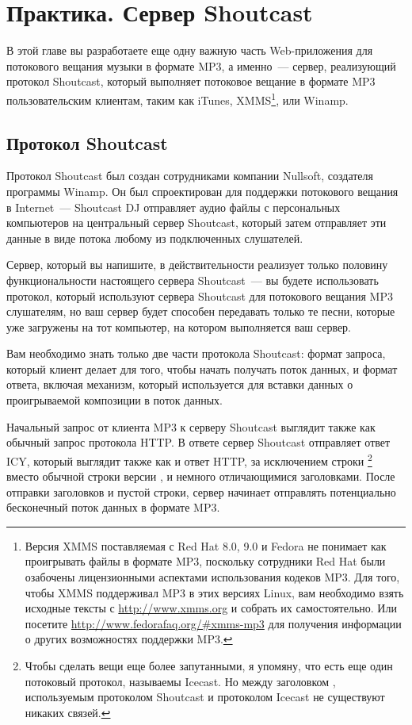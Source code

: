 \chapter{Практика. Сервер Shoutcast}
\label{ch:28}

В этой главе вы разработаете еще одну важную часть Web-приложения для потокового вещания
музыки в формате MP3, а именно~--- сервер, реализующий протокол Shoutcast, который
выполняет потоковое вещание в формате MP3 пользовательским клиентам, таким как iTunes,
XMMS\footnote{Версия XMMS поставляемая с Red Hat 8.0, 9.0 и Fedora не понимает как
  проигрывать файлы в формате MP3, поскольку сотрудники Red Hat были озабочены
  лицензионными аспектами использования кодеков MP3.  Для того, чтобы XMMS поддерживал MP3
  в этих версиях Linux, вам необходимо взять исходные тексты с \url{http://www.xmms.org} и
  собрать их самостоятельно.  Или посетите \url{http://www.fedorafaq.org/#xmms-mp3} для
  получения информации о других возможностях поддержки MP3.}, или Winamp.

\section{Протокол Shoutcast}

Протокол Shoutcast был создан сотрудниками компании Nullsoft, создателя программы
Winamp. Он был спроектирован для поддержки потокового вещания в Internet~--- Shoutcast DJ
отправляет аудио файлы с персональных компьютеров на центральный сервер Shoutcast, который
затем отправляет эти данные в виде потока любому из подключенных слушателей.

Сервер, который вы напишите, в действительности реализует только половину функциональности
настоящего сервера Shoutcast~--- вы будете использовать протокол, который используют
сервера Shoutcast для потокового вещания MP3 слушателям, но ваш сервер будет способен
передавать только те песни, которые уже загружены на тот компьютер, на котором выполняется
ваш сервер.

Вам необходимо знать только две части протокола Shoutcast: формат запроса, который клиент
делает для того, чтобы начать получать поток данных, и формат ответа, включая механизм,
который используется для вставки данных о проигрываемой композиции в поток данных.

Начальный запрос от клиента MP3 к серверу Shoutcast выглядит также как обычный запрос
протокола HTTP.  В ответе сервер Shoutcast отправляет ответ ICY, который выглядит также
как и ответ HTTP, за исключением строки \footnote{Чтобы сделать вещи еще более
  запутанными, я упомяну, что есть еще один потоковый протокол, называемы Icecast. Но
  между заголовком , используемым протоколом Shoutcast и протоколом Icecast не
  существуют никаких связей.} вместо обычной строки версии , и немного
отличающимися заголовками. После отправки заголовков и пустой строки, сервер начинает
отправлять потенциально бесконечный поток данных в формате MP3.

